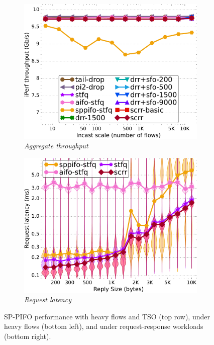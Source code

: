 \begin{figure}[t]
 	\begin{subfigure}[t]{.49\linewidth}
		\centering
                \includegraphics[width=1\linewidth]{figs/paral_cn_6t4x1024_mss_1500_bw_comp_methods.pdf}
                \caption{\small{\textit{Aggregate throughput}}}
	        \label{fig:sppifo-fair-bw}
	\end{subfigure}
	\begin{subfigure}[t]{.49\linewidth}
		\centering
                \includegraphics[width=1\linewidth]{figs/pkt_size_cn_2t4x8_mn_2tb2x4_per_15_mss_1468_lat_comp_sppifo_violins.pdf}
                \caption{\small{\textit{Request latency}}}
	        \label{fig:sppifo-req-lat}
	\end{subfigure}
        \vspace{-2mm}
        \caption{\small{SP-PIFO  performance with heavy flows and TSO (top row), under heavy flows (bottom left), and under request-response workloads (bottom right).}}
        \vspace{-3mm}
\end{figure}

